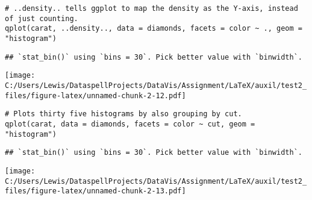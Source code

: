 \begin{verbatim}
# ..density.. tells ggplot to map the density as the Y-axis, instead of just counting.
qplot(carat, ..density.., data = diamonds, facets = color ~ ., geom = "histogram")
\end{verbatim}

\begin{verbatim}
## `stat_bin()` using `bins = 30`. Pick better value with `binwidth`.
\end{verbatim}

\texttt{[image: C:/Users/Lewis/DataspellProjects/DataVis/Assignment/LaTeX/auxil/test2\_files/figure-latex/unnamed-chunk-2-12.pdf]}

\begin{verbatim}
# Plots thirty five histograms by also grouping by cut.
qplot(carat, data = diamonds, facets = color ~ cut, geom = "histogram")
\end{verbatim}

\begin{verbatim}
## `stat_bin()` using `bins = 30`. Pick better value with `binwidth`.
\end{verbatim}

\texttt{[image: C:/Users/Lewis/DataspellProjects/DataVis/Assignment/LaTeX/auxil/test2\_files/figure-latex/unnamed-chunk-2-13.pdf]}

